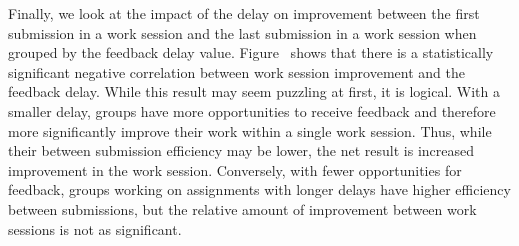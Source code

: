 Finally, we look at the impact of the delay on improvement between the first
submission in a work session and the last submission in a work session when
grouped by the feedback delay value. Figure~
shows that there is a statistically significant negative correlation between
work session improvement and the feedback delay. While this result may seem
puzzling at first, it is logical. With a smaller delay, groups have more
opportunities to receive feedback and therefore more significantly improve
their work within a single work session. Thus, while their between submission
efficiency may be lower, the net result is increased improvement in the work
session. Conversely, with fewer opportunities for feedback, groups working on
assignments with longer delays have higher efficiency between submissions, but
the relative amount of improvement between work sessions is not as significant.

